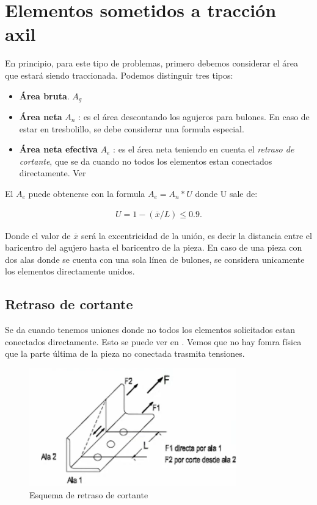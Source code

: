\documentclass[../main.tex]{subfiles}
\begin{document}
\section{Elementos sometidos a tracción axil}

En principio, para este tipo de problemas, primero debemos considerar el área
que estará siendo traccionada. Podemos distinguir tres tipos:

\begin{itemize}
  \item \textbf{Área bruta}. $A_g$
  \item  \textbf{Área neta} $A_n$ : es el área descontando los agujeros para 
    bulones. En caso de estar en tresbolillo, se debe considerar una formula
    especial.
  \item \textbf{Área neta efectiva} $A_e$ : es el área neta teniendo en cuenta el
    \textit{retraso de cortante}, que se da cuando no todos los elementos estan
    conectados directamente. Ver 
\end{itemize}

El $A_e$ puede obtenerse con la formula $A_e = A_n * U$ donde U sale de:

\begin{align*}
  U = 1 - (\overline{x}/L)\leq 0.9
.\end{align*}

Donde el valor de $\overline{x}$ será la excentricidad de la unión, es decir la 
distancia entre el baricentro del agujero hasta el baricentro de la pieza. En
caso de una pieza con dos alas donde se cuenta con una sola línea de bulones,
se considera unicamente los elementos directamente unidos.

\subsection{Retraso de cortante}

Se da cuando tenemos uniones donde no todos los elementos solicitados estan
conectados directamente. Esto se puede ver en . Vemos 
que no hay fomra física que la parte última de la pieza no conectada trasmita
tensiones.

\begin{figure}[htpb]
  \centering
  \includegraphics[width=0.8\textwidth]{../images/20210412/retrasocortante}
  \caption{Esquema de retraso de cortante}
  \label{fig:retraso-cortante}
\end{figure}
\end{document}
